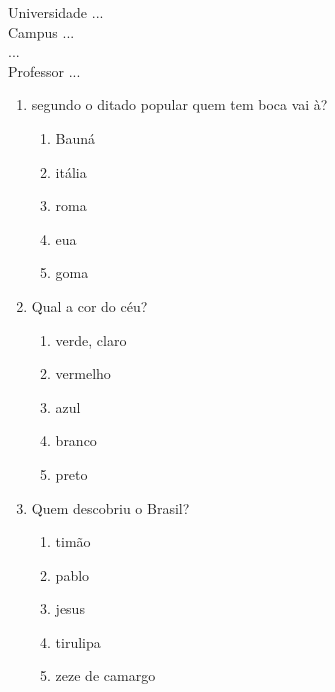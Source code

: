 \documentclass[10pt,a4paper,twocolumn]{report}
\begin{document}
\begin{flushleft}
Universidade ...\\
Campus ...\\
...\\
Professor ...\\
\end{flushleft}




 \begin{enumerate} 
    \item  segundo o ditado popular quem tem boca vai à?





    \begin{enumerate}
    \item  Bauná

\item  itália

\item  roma

\item  eua

\item  goma


    \end{enumerate} 
    \item  Qual a cor do céu?





    \begin{enumerate}
    \item  verde, claro

\item  vermelho

\item  azul

\item  branco

\item  preto


    \end{enumerate} 
    \item  Quem descobriu o Brasil?





    \begin{enumerate}
    \item  timão

\item  pablo

\item  jesus

\item  tirulipa

\item  zeze de camargo


    \end{enumerate}\end{enumerate} 
\end{document}
